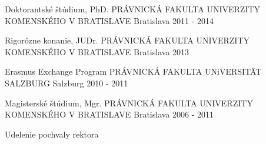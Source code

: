 

\begin{cventries}

  \cventry
    {Doktorantské štúdium, PhD.} %
    {PRÁVNICKÁ FAKULTA UNIVERZITY KOMENSKÉHO V BRATISLAVE} %
    {Bratislava} %
    {2011 - 2014} %
    {
    }

  \cventry
    {Rigorózne konanie, JUDr.} %
    {PRÁVNICKÁ FAKULTA UNIVERZITY KOMENSKÉHO V BRATISLAVE} %
    {Bratislava} %
    {2013} %
    {
    }

  \cventry
    {Erasmus Exchange Program} %
    {PRÁVNICKÁ FAKULTA UNiVERSITÄT SALZBURG} %
    {Salzburg} %
    {2010 - 2011} %
    {
    }

  \cventry
    {Magisterské štúdium, Mgr.} %
    {PRÁVNICKÁ FAKULTA UNIVERZITY KOMENSKÉHO V BRATISLAVE} %
    {Bratislava} %
    {2006 - 2011} %
    {
      \begin{cvitems} %
        \item {Udelenie pochvaly rektora}
      \end{cvitems}
    }

\end{cventries}
